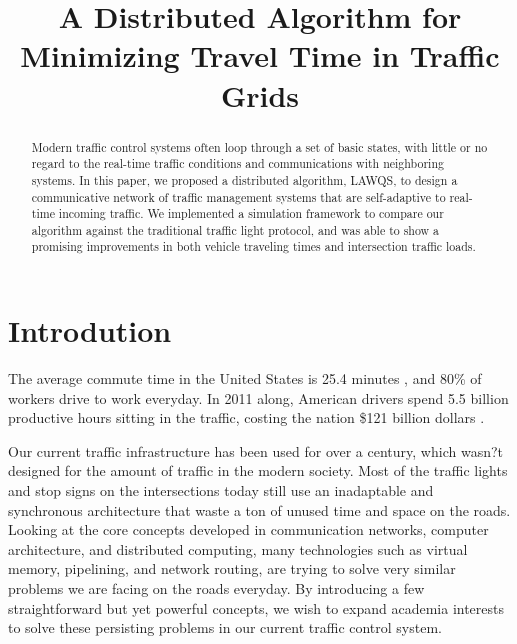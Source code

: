 \documentclass[conference]{IEEEtran}
\begin{document}
\title{A Distributed Algorithm for Minimizing Travel Time in Traffic Grids}

\author{
\and
{}
}
\maketitle
\onehalfspace
\begin{abstract}
Modern traffic control systems often loop through a set of basic states, with little or no regard to the real-time traffic conditions and communications with neighboring systems. In this paper, we proposed a distributed algorithm, LAWQS, to design a communicative network of traffic management systems that are self-adaptive to real-time incoming traffic. We implemented a simulation framework to compare our algorithm against the traditional traffic light protocol, and was able to show a promising improvements in both vehicle traveling times and intersection traffic loads.
\end{abstract}

\section{Introdution}

The average commute time in the United States is 25.4 minutes \cite{commuting_time}, and 80\% of workers drive to work everyday. In 2011 along, American drivers spend 5.5 billion productive hours sitting in the traffic, costing the nation \$121 billion dollars \cite{commuting_expense}. 

Our current traffic infrastructure has been used for over a century, which wasn?t designed for the amount of traffic in the modern society. Most of the traffic lights and stop signs on the intersections today still use an inadaptable and synchronous architecture that waste a ton of unused time and space on the roads. Looking at the core concepts developed in communication networks, computer architecture, and distributed computing, many technologies such as virtual memory, pipelining, and network routing, are trying to solve very similar problems we are facing on the roads everyday. By introducing a few straightforward but yet powerful concepts, we wish to expand academia interests to solve these persisting problems in our current traffic control system.
\end{document}
